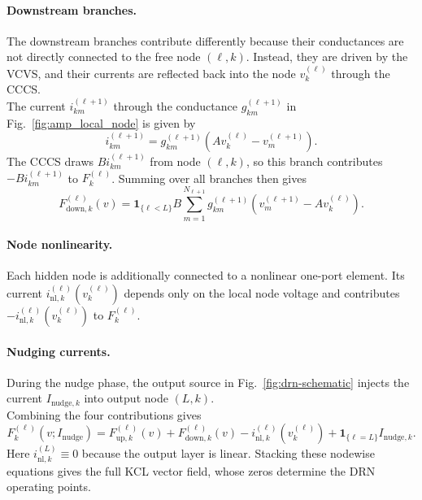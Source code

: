 \documentclass{article}
\begin{document}
\paragraph{Downstream branches.}
The downstream branches contribute differently because
their conductances are not directly connected to the free node
$(\ell,k)$. Instead, they are driven by the VCVS, and their currents are
reflected back into the node $v_k^{(\ell)}$ through the CCCS.
\\
The current $i_{km}^{(\ell+1)}$ through the conductance $g_{km}^{(\ell+1)}$ in Fig.~\ref{fig:amp_local_node} is given by
  \begin{equation}
  i_{km}^{(\ell+1)}
  =
  g_{km}^{(\ell+1)}
  \left(
  A v_k^{(\ell)}-v_m^{(\ell+1)}
  \right).
  \end{equation}
  The CCCS draws $B i_{km}^{(\ell+1)}$ from node $(\ell,k)$, so this branch
  contributes $-B i_{km}^{(\ell+1)}$ to $F_k^{(\ell)}$. Summing over all branches then gives
  \begin{equation}
  F_{\mathrm{down},k}^{(\ell)}(v)
  =
  \mathbf 1_{\{\ell<L\}}B
  \sum_{m=1}^{N_{\ell+1}}
  g_{km}^{(\ell+1)}
  \left(
  v_m^{(\ell+1)}-A v_k^{(\ell)}
  \right).
  \label{eq:amp_downstream_field}
  \end{equation}


\paragraph{Node nonlinearity.}
Each hidden node is additionally connected to a nonlinear one-port element.
Its current $i_{\mathrm{nl},k}^{(\ell)}(v_k^{(\ell)})$ depends only on the local
node voltage and contributes
$-i_{\mathrm{nl},k}^{(\ell)}(v_k^{(\ell)})$ to $F_k^{(\ell)}$.

\paragraph{Nudging currents.}
During the nudge phase, the output source in
Fig.~\ref{fig:drn-schematic} injects the current
\(I_{\mathrm{nudge},k}\) into output node \((L,k)\).
\\
Combining the four contributions gives
 \begin{equation}
F_k^{(\ell)}(v;I_{\mathrm{nudge}})
=
F_{\mathrm{up},k}^{(\ell)}(v)
+
F_{\mathrm{down},k}^{(\ell)}(v)
-
i_{\mathrm{nl},k}^{(\ell)}\!\left(v_k^{(\ell)}\right)
+
\mathbf 1_{\{\ell=L\}}I_{\mathrm{nudge},k}.
\label{eq:amp_kcl_field_decomposition}
\end{equation}
  Here $i_{\mathrm{nl},k}^{(L)}\equiv0$ because the output layer is linear. Stacking these
  nodewise equations gives the full KCL vector field, whose zeros determine the
  DRN operating points.
\end{document}
